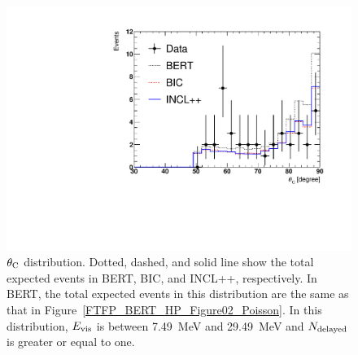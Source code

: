 

\begin{figure}[b]
	\centering
	\includegraphics[width=12cm]{PDF/Figure02_02/Comparison_02/Figure02_Poisson}
	\caption[$\theta_{\rm C}$ distribution]{
	$\theta_{\rm C}$ distribution.
	Dotted, dashed, and solid line show the total expected events in BERT, BIC, and INCL++, respectively.
	In BERT, the total expected events in this distribution are the same as that in Figure~\ref{FTFP_BERT_HP_Figure02_Poisson}.
	In this distribution, $E_{\rm vis}$ is between 7.49~MeV and 29.49~MeV and $N_{\rm delayed}$ is greater or equal to one.
	}\label{Comparison_Figure02_Poisson}
\end{figure}

